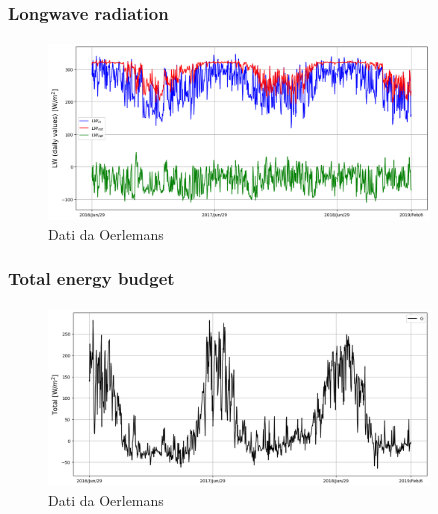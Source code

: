 

\begin{frame}
    \frametitle{Longwave radiation}
    \framesubtitle{}

    \begin{figure}
        \includegraphics[width=0.9\textwidth]{Immagini/longWaveDaily.png}
        \caption{Dati da Oerlemans}
    \end{figure}
  
\end{frame}


\begin{frame}
    \frametitle{Total energy budget}
    \framesubtitle{}

    \begin{figure}
        \includegraphics[width=0.9\textwidth]{Immagini/totalEnergy.png}
        \caption{Dati da Oerlemans}
    \end{figure}
  
\end{frame}


